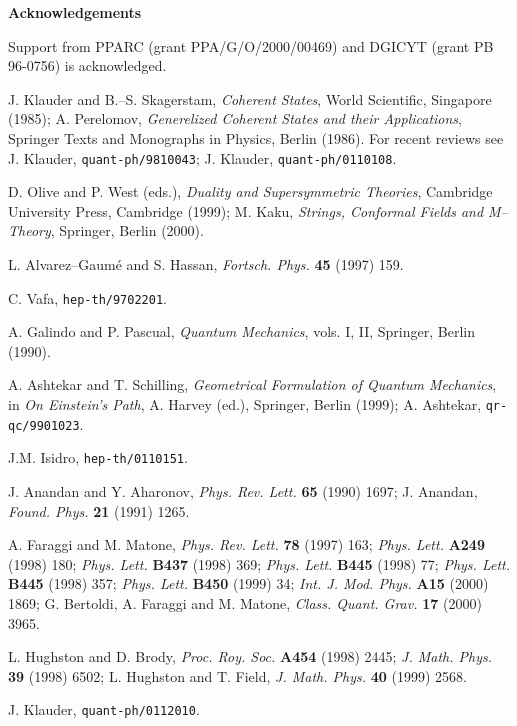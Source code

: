 \documentclass[a4paper,a4paper]{article}
\begin{document}
{\bf Acknowledgements}

Support from PPARC (grant PPA/G/O/2000/00469) and DGICYT (grant PB 96-0756) is acknowledged.


\begin{thebibliography}{99}

J. Klauder and B.--S. Skagerstam, {\it Coherent States}, World Scientific, Singapore (1985);
A. Perelomov, {\it Generelized Coherent States and their Applications}, Springer Texts and
Monographs in Physics, Berlin (1986). For recent reviews see J. Klauder, {\tt quant-ph/9810043};
J. Klauder, {\tt quant-ph/0110108}.

D. Olive and P. West (eds.), {\it Duality and Supersymmetric Theories}, Cambridge 
University Press, Cambridge (1999);
M. Kaku, {\it Strings, Conformal Fields and M--Theory},  Springer, Berlin (2000).

L. Alvarez--Gaum\'e and S. Hassan, {\it Fortsch. Phys.} {\bf 45} (1997) 159.

C. Vafa, {\tt hep-th/9702201}.

A. Galindo and P. Pascual, {\it Quantum Mechanics}, vols. I, II, Springer, Berlin 
(1990).

A. Ashtekar and T. Schilling, {\it Geometrical Formulation of Quantum 
Mechanics}, in {\it On Einstein's Path}, A. Harvey (ed.), Springer, 
Berlin (1999);
A. Ashtekar, {\tt qr-qc/9901023}.

J.M. Isidro, {\tt hep-th/0110151}.

J. Anandan and Y. Aharonov, {\it Phys. Rev. Lett.} {\bf 65} (1990) 1697;
J. Anandan, {\it Found. Phys.} {\bf 21} (1991) 1265.

A. Faraggi and M. Matone,
{\it Phys. Rev. Lett.} {\bf 78} (1997) 163;
{\it Phys. Lett.} {\bf A249} (1998) 180; 
{\it Phys. Lett.} {\bf B437} (1998) 369;
{\it Phys. Lett.} {\bf B445} (1998) 77;
{\it Phys. Lett.} {\bf B445} (1998) 357;
{\it Phys. Lett.} {\bf B450} (1999) 34;
{\it Int. J. Mod. Phys.} {\bf A15} (2000) 1869;
G. Bertoldi, A. Faraggi and M. Matone, 
{\it Class. Quant. Grav.} {\bf 17} (2000) 3965.

L. Hughston and D. Brody, {\it Proc. Roy. Soc.} {\bf A454} (1998) 2445;
{\it J. Math. Phys.} {\bf 39} (1998) 6502;
L. Hughston and T. Field, {\it J. Math. Phys.} {\bf 40} (1999) 2568.

J. Klauder, {\tt quant-ph/0112010}.


\end{thebibliography}
\end{document}
